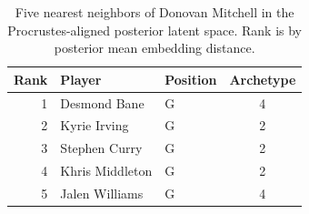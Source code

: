 \begin{table}[htbp]
  \centering\small
  \begin{tabular}{rllc}
    \toprule
    Rank & Player & Position & Archetype \\
    \midrule
    1 & Desmond Bane & G & 4 \\
    2 & Kyrie Irving & G & 2 \\
    3 & Stephen Curry & G & 2 \\
    4 & Khris Middleton & G & 2 \\
    5 & Jalen Williams & G & 4 \\
    \bottomrule
  \end{tabular}
  \caption{Five nearest neighbors of Donovan Mitchell in the Procrustes-aligned posterior latent space. Rank is by posterior mean embedding distance.}
  \label{tab:Donovan_Mitchell_neighbors}
\end{table}

